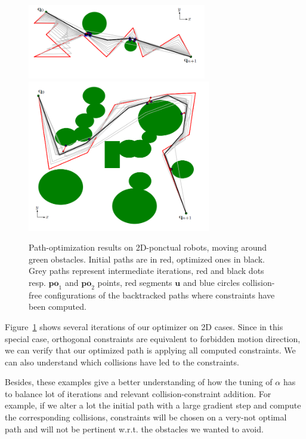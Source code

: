 \documentclass{tADR2e}
\newcommand\po{\mathbf{po}}
\begin{document}
\begin{figure}[t]
	\centering
	\includegraphics[width=7.8cm]{contact_points6.png}
	\includegraphics[width=8cm]{contact_points2potential.png}
	\caption{Path-optimization results on 2D-ponctual robots, moving around 
	green obstacles. Initial paths are in red, optimized ones in black. Grey paths 
	represent intermediate iterations, red and black dots resp. $\po_1$ and $\po_2$ 
	points, red segments $\mathbf{u}$ and blue circles collision-free configurations 
	of the backtracked paths 
	where constraints have been computed.}
	\label{2D_long}
\end{figure}

Figure~\ref{2D_long} shows several iterations of our optimizer on 2D cases. Since 
in this special case, orthogonal constraints are equivalent to forbidden motion 
direction, we can verify that our optimized path is applying 
all computed constraints. We can also understand which collisions have led to 
the constraints.

Besides, these examples give a better understanding of how the tuning of $\alpha$ 
has to balance lot of iterations and relevant collision-constraint addition. For 
example, if we alter a lot the initial path with a large gradient step and 
compute the corresponding collisions, constraints will be chosen on a very-not 
optimal path and will not be pertinent w.r.t. the obstacles we wanted to 
avoid.
\end{document}

